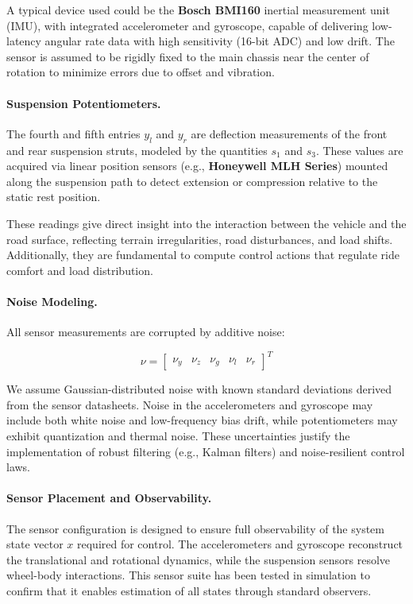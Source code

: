 \documentclass[]{report}
\begin{document}
A typical device used could be the \textbf{Bosch BMI160} inertial measurement unit (IMU), with integrated accelerometer and gyroscope, capable of delivering low-latency angular rate data with high sensitivity (16-bit ADC) and low drift. The sensor is assumed to be rigidly fixed to the main chassis near the center of rotation to minimize errors due to offset and vibration.

\paragraph{Suspension Potentiometers.}
The fourth and fifth entries $y_l$ and $y_r$ are deflection measurements of the front and rear suspension struts, modeled by the quantities $s_1$ and $s_3$. These values are acquired via linear position sensors (e.g., \textbf{Honeywell MLH Series}) mounted along the suspension path to detect extension or compression relative to the static rest position.

These readings give direct insight into the interaction between the vehicle and the road surface, reflecting terrain irregularities, road disturbances, and load shifts. Additionally, they are fundamental to compute control actions that regulate ride comfort and load distribution.

\paragraph{Noise Modeling.}
All sensor measurements are corrupted by additive noise:

\[
\nu = \begin{bmatrix}
	\nu_y & \nu_z & \nu_g & \nu_l & \nu_r
\end{bmatrix}^T
\]

We assume Gaussian-distributed noise with known standard deviations derived from the sensor datasheets. Noise in the accelerometers and gyroscope may include both white noise and low-frequency bias drift, while potentiometers may exhibit quantization and thermal noise. These uncertainties justify the implementation of robust filtering (e.g., Kalman filters) and noise-resilient control laws.

\paragraph{Sensor Placement and Observability.}
The sensor configuration is designed to ensure full observability of the system state vector $x$ required for control. The accelerometers and gyroscope reconstruct the translational and rotational dynamics, while the suspension sensors resolve wheel-body interactions. This sensor suite has been tested in simulation to confirm that it enables estimation of all states through standard observers.
\end{document}
